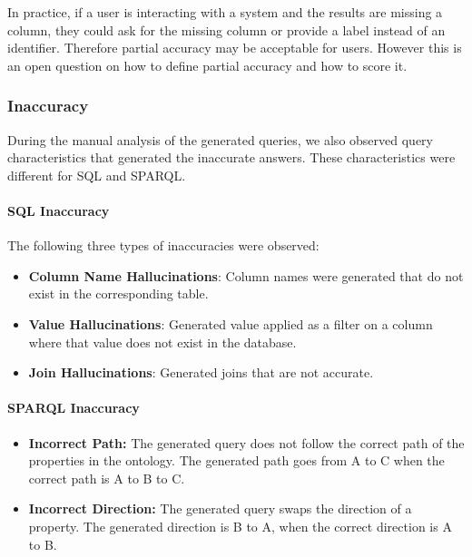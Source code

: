 \documentclass[11pt]{article}
\begin{document}
In practice, if a user is interacting with a system and the results are missing a column, they could ask for the missing column or provide a label instead of an identifier. 
Therefore partial accuracy may be acceptable for users. 
However this is an open question on how to define partial accuracy and how to score it.

\subsubsection{Inaccuracy}

During the manual analysis of the generated queries, we also observed query characteristics that generated the inaccurate answers. 
These characteristics were different for SQL and SPARQL. 

\paragraph{SQL Inaccuracy}
The following three types of inaccuracies were observed: 
\begin{itemize}
    \item \textbf{Column Name Hallucinations}: Column names were generated that do not exist in the corresponding table. 
    \item \textbf{Value Hallucinations}: Generated value applied as a filter on a column where that value does not exist in the database.
    \item \textbf{Join Hallucinations}: Generated joins that are not accurate. 
\end{itemize}

\paragraph{SPARQL Inaccuracy}

\begin{itemize}
    \item \textbf{Incorrect Path:} The generated query does not follow the correct path of the properties in the ontology. The generated path goes from A to C when the correct path is A to B to C. 
    \item \textbf{Incorrect Direction:} The generated query swaps the direction of a property. The generated direction is B to A, when the correct direction is A to B. 
\end{itemize}
\end{document}
